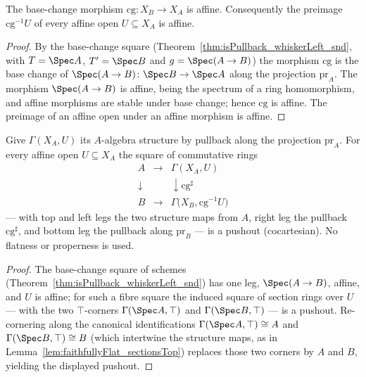 \begin{theorem}
  \label{thm:isAffineHom_cg}
  \leanok
  The base-change morphism \(\mathrm{cg} \colon X_B \to X_A\) is affine. Consequently the
  preimage \(\mathrm{cg}^{-1}U\) of every affine open \(U \subseteq X_A\) is affine.
\end{theorem}
\begin{proof}
  \leanok
  By the base-change square (Theorem~\ref{thm:isPullback_whiskerLeft_snd}, with \(T = \Spec A\),
  \(T' = \Spec B\) and \(g = \Spec(A \to B)\)) the morphism \(\mathrm{cg}\) is the base change of
  \(\Spec(A \to B) \colon \Spec B \to \Spec A\) along the projection \(\mathrm{pr}_A\). The
  morphism \(\Spec(A \to B)\) is affine, being the spectrum of a ring homomorphism, and affine
  morphisms are stable under base change; hence \(\mathrm{cg}\) is affine. The preimage of an
  affine open under an affine morphism is affine.
\end{proof}

\begin{theorem}
  \label{thm:isPushout_cgSectionRing}
  \leanok
  Give \(\Gamma(X_A, U)\) its \(A\)-algebra structure by pullback along the projection
  \(\mathrm{pr}_A\). For every affine open \(U \subseteq X_A\) the square of commutative rings
  \[
    \begin{array}{ccc}
      A & \longrightarrow & \Gamma(X_A, U) \\
      \downarrow & & \downarrow \mathrm{cg}^{\sharp} \\
      B & \longrightarrow & \Gamma\bigl(X_B, \mathrm{cg}^{-1}U\bigr)
    \end{array}
  \]
  --- with top and left legs the two structure maps from \(A\), right leg the pullback
  \(\mathrm{cg}^{\sharp}\), and bottom leg the pullback along \(\mathrm{pr}_B\) --- is a pushout
  (cocartesian). No flatness or properness is used.
\end{theorem}
\begin{proof}
  \leanok
  The base-change square of schemes (Theorem~\ref{thm:isPullback_whiskerLeft_snd}) has one leg,
  \(\Spec(A \to B)\), affine, and \(U\) is affine; for such a fibre square the induced square of
  section rings over \(U\) --- with the two \(\top\)-corners \(\Gamma(\Spec A, \top)\) and
  \(\Gamma(\Spec B, \top)\) --- is a pushout. Re-cornering along the canonical identifications
  \(\Gamma(\Spec A, \top) \cong A\) and \(\Gamma(\Spec B, \top) \cong B\) (which intertwine the
  structure maps, as in Lemma~\ref{lem:faithfullyFlat_sectionsTop}) replaces those two corners by
  \(A\) and \(B\), yielding the displayed pushout.
\end{proof}

